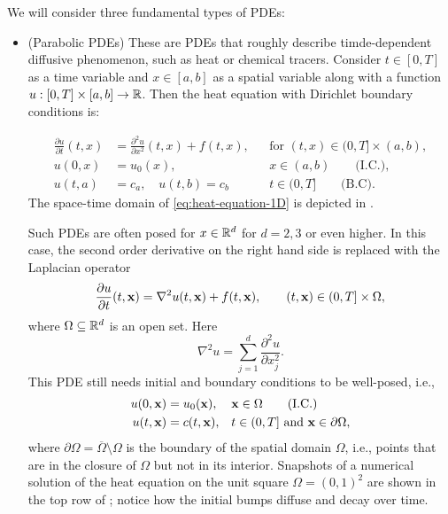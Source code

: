 We will consider three fundamental types of PDEs: 
\begin{itemize}
    
    \item (Parabolic PDEs) These are PDEs that roughly 
    describe timde-dependent diffusive phenomenon, such as heat or 
    chemical tracers. Consider $t \in [0, T]$ as a time variable 
    and $x \in [a, b]$ as a spatial variable along with 
    a function $u: [0, T] \times [a, b] \to \mathbb{R}$. Then the heat equation 
    with Dirichlet boundary conditions is: 
    
    \begin{equation}\label{eq:heat-equation-1D}
        \begin{aligned}
                \frac{\partial u}{\partial t}(t, x) &=  \frac{\partial^2 u}{ \partial x^2}(t, x) + f(t, x), && \text{for } (t,x) \in (0,T] \times (a,b), \\
                u(0, x) & = u_0(x), && x \in (a, b) \qquad \text{(I.C.)},\\
                u(t, a) &= c_a, \quad u(t, b) = c_b && t \in (0, T] \qquad \text{(B.C)}. 
        \end{aligned}
    \end{equation}
    The space-time domain of \eqref{eq:heat-equation-1D} is depicted
    in . 
    
    Such PDEs are 
    often posed for $x \in \mathbb{R}^d$ for $d=2,3$ or even higher. 
    In this case, the second order derivative on the 
    right hand side is replaced with the Laplacian operator 
    \begin{equation}\label{eq:heat-equation}
        \frac{\partial u}{\partial t}(t, \mathbf{x}) = 
        \nabla^2 u (t, \mathbf{x}) + f(t, \mathbf{x}), \qquad (t, \mathbf{x}) \in (0, T] \times \Omega,
    \end{equation}
    where $\Omega \subseteq \mathbb{R}^d$ is an open set. Here 
    \begin{equation}
        \nabla^2 u = \sum_{j=1}^d \frac{\partial^2 u}{\partial x_j^2}.
    \end{equation}
    This PDE  still needs initial and boundary
    conditions to be well-posed, i.e., 
    \begin{equation*}
        \begin{aligned}
        u(0, \mathbf{x}) & = u_0(\mathbf{x}), && \mathbf{x} \in \Omega \qquad \text{(I.C.)} \\
        u(t, \mathbf{x}) & = c(t, \mathbf{x}),  && t \in (0, T] \text{ and } \mathbf{x} \in \partial \Omega,         
        \end{aligned}
    \end{equation*}
    where $\partial \Omega = \overline{\Omega} \setminus \Omega$ is the boundary 
    of the spatial domain $\Omega$, i.e., points that 
    are in the closure of $\Omega$ but not in its interior. 
    Snapshots of a numerical solution of the heat equation on the 
    unit square $\Omega = (0,1)^2$ are shown in the top row of 
    ; notice how the initial bumps 
    diffuse and decay over time.


\end{itemize}
